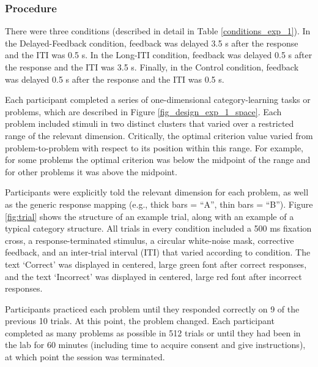 \documentclass[doc, floatsintext]{apa7}
\begin{document}
\subsubsection{Procedure}
There were three conditions (described in detail in Table
\ref{conditions_exp_1}). In the Delayed-Feedback condition,
feedback was delayed 3.5 s after the response and the ITI
was 0.5 s. In the Long-ITI condition, feedback was delayed
0.5 s after the response and the ITI was 3.5 s. Finally, in
the Control condition, feedback was delayed 0.5 s after the
response and the ITI was 0.5 s.

Each participant completed a series of one-dimensional
category-learning tasks or problems, which are described in
Figure \ref{fig_design_exp_1_space}. Each problem included
stimuli in two distinct clusters that varied over a
restricted range of the relevant dimension. Critically, the
optimal criterion value varied from problem-to-problem with
respect to its position within this range. For example, for
some problems the optimal criterion was below the midpoint
of the range and for other problems it was above the
midpoint. 

Participants were explicitly told the relevant dimension for
each problem, as well as the generic response mapping (e.g.,
thick bars = ``A'', thin bars = ``B''). Figure
\ref{fig:trial} shows the structure of an example trial,
along with an example of a typical category structure. All
trials in every condition included a 500 ms fixation cross,
a response-terminated stimulus, a circular white-noise mask,
corrective feedback, and an inter-trial interval (ITI) that
varied according to condition. The text `Correct' was
displayed in centered, large green font after correct
responses, and the text `Incorrect' was displayed in
centered, large red font after incorrect responses.

Participants practiced each problem until they responded
correctly on 9 of the previous 10 trials. At this point, the
problem changed. Each participant completed as many problems
as possible in 512 trials or until they had been in the lab
for 60 minutes (including time to acquire consent and give
instructions), at which point the session was terminated.
\end{document}
